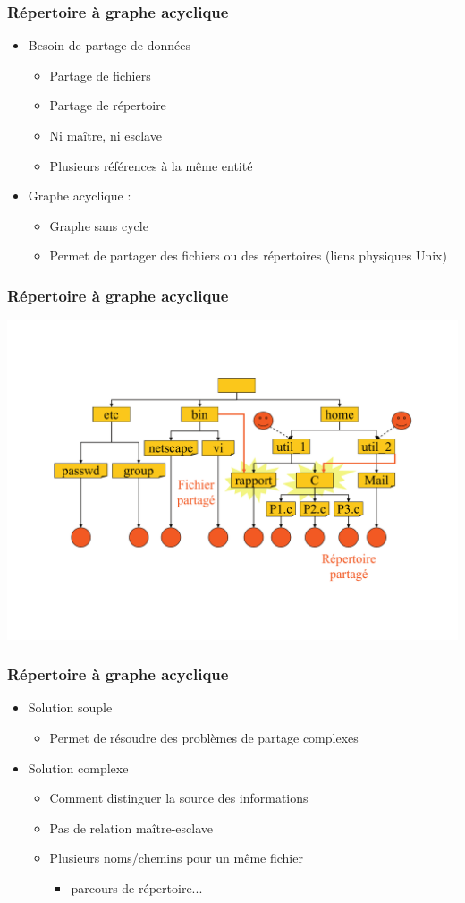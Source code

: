 \begin{frame}
\frametitle{Répertoire à graphe acyclique}
\begin{itemize}
\item Besoin de partage de données
\begin{itemize}
\item Partage de fichiers
\item Partage de répertoire
\item Ni maître, ni esclave
\item Plusieurs références à la même entité
\end{itemize}
\item Graphe acyclique :
\begin{itemize}
\item Graphe sans cycle
\item Permet de partager des fichiers ou des répertoires (liens physiques Unix)
\end{itemize}
\end{itemize}
\end{frame}

\begin{frame}
\frametitle{Répertoire à graphe acyclique}
\includegraphics[width=.9\textwidth]{../illustration/repertoire_graphe.pdf}
\end{frame}

\begin{frame}
\frametitle{Répertoire à graphe acyclique}
\begin{itemize}
\item Solution souple
\begin{itemize}
\item Permet de résoudre des problèmes de partage complexes
\end{itemize}
\item Solution complexe
\begin{itemize}
\item Comment distinguer la source des informations
\item Pas de relation maître-esclave
\item Plusieurs noms/chemins pour un même fichier
\begin{itemize}
  \item parcours de répertoire...
\end{itemize}
\end{itemize}
\end{itemize}
\end{frame}

